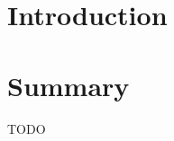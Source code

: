 \label{chap:domain_of_interest}

\section{Introduction}
\label{sec:domain_of_interest_introduction}



\section{Summary}
\label{sec:domain_of_interest_summary}

TODO


